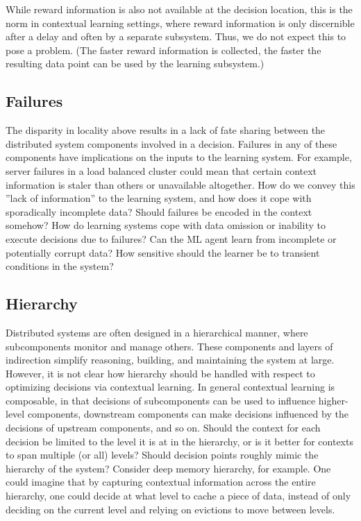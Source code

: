 \documentclass[a4paper,twocolumn]{article}
\begin{document}
While reward information is also not available at the decision location, this is
the norm in contextual learning settings, where reward information is only
discernible after a delay and often by a separate subsystem. Thus, we do not
expect this to pose a problem. (The faster reward information is collected, the
faster the resulting data point can be used by the learning subsystem.)

\subsection*{Failures}

The disparity in locality above results in a lack of fate sharing between the
distributed system components involved in a decision.  Failures in any of
these components have implications on the inputs to the learning system. For
example, server failures in a load balanced cluster could mean that certain
context information is staler than others or unavailable altogether. How do we
convey this ''lack of information'' to the learning system, and how does it
cope with sporadically incomplete data? Should failures be encoded in the
context somehow?
How do learning
systems cope with data omission or inability to execute decisions due to
failures? Can the ML agent learn from incomplete or potentially corrupt data?
How sensitive should the learner be to transient conditions in the system?

\subsection*{Hierarchy}

Distributed systems are often designed in a hierarchical manner, where
subcomponents monitor and manage others. These components and layers of
indirection simplify reasoning, building, and maintaining the system at
large. However, it is not clear how hierarchy should be handled with respect to
optimizing decisions via contextual learning. In general contextual learning is
composable, in that decisions of subcomponents can be used to influence
higher-level components, downstream components can make decisions influenced by
the decisions of upstream components, and so on.  Should the context for each
decision be limited to the level it is at in the hierarchy, or is it better for
contexts to span multiple (or all) levels? Should decision points roughly mimic
the hierarchy of the system? Consider deep memory hierarchy, for example. One
could imagine that by capturing contextual information across the entire
hierarchy, one could decide at what level to cache a piece of data, instead of
only deciding on the current level and relying on evictions to move between
levels.
\end{document}

